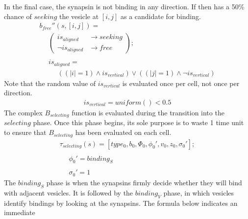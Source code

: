 \documentclass{acm_proc_article-sp}
\begin{document}
In the final case, the synapsin is not binding in any direction.  
If then has a 50\% chance of $seeking$ the vesicle at $[i, j]$ as
a candidate for binding.
\begin{displaymath} \begin{array}{l}
b_{free}''(s, [i, j]) = \\
\hspace{16pt} \left( \begin{array}{ll} is_{aligned} & \rightarrow seeking \\
                                       \neg is_{aligned} & \rightarrow free \end{array} \right); \\
\\
\hspace{16pt} is_{aligned} = \\
\hspace{16pt} \hspace{16pt} ((|i| = 1) \wedge is_{vertical}) \vee ((|j| = 1) \wedge \neg is_{vertical})
\end{array} \end{displaymath}
Note that the random value of $is_{vertical}$ is evaluated once 
per cell, not once per direction. 
\begin{displaymath} \begin{array}{l}
is_{vertical} = uniform() < 0.5
\end{array} \end{displaymath}
The complex $B_{selecting}$ function is evaluated during the transition
into the $selecting$ phase.  Once this phase begins, its sole purpose
is to waste 1 time unit to ensure that $B_{selecting}$ has been 
evaluated on each cell.
\begin{displaymath} \begin{array}{l}
\tau_{selecting}(s) = [type_0, b_0, \Phi_0, \phi_0', v_0, z_0, \sigma_0']; \\
\\
\hspace{16pt} \phi_0' = binding_S \\
\\
\hspace{16pt} \sigma_0' = 1
\end{array} \end{displaymath}
The $binding_S$ phase is when the synapsins firmly decide whether
they will bind with adjacent vesicles.  It is followed by the 
$binding_V$ phase, in which vesicles identify bindings by looking
at the synapsins.  The formula below indicates an immediate 
\end{document}
